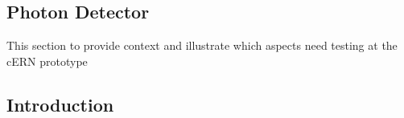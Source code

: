 \subsection{Photon Detector}
This section to provide context and illustrate which aspects need testing at the cERN prototype

\subsection{Introduction}

